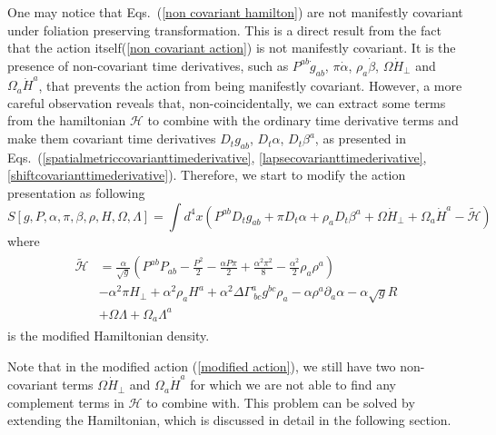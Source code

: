 One may notice that Eqs.~(\ref{non covariant hamilton}) are not manifestly covariant under foliation preserving transformation. This is a direct result from the fact that the action itself(\ref{non covariant action}) is not manifestly covariant. It is the presence of non-covariant time derivatives, such as $P^{ab}{\dot g}_{ab}$, $\pi{\dot \alpha}$, $\rho_{a}{\dot \beta}$, $\Omega{\dot H}_{\perp}$ and $\Omega_{a}{\dot H}^{a}$, that prevents the action from being manifestly covariant. However, a more careful observation reveals that, non-coincidentally, we can extract some terms from the hamiltonian $\mathscr{H}$ to combine with the ordinary time derivative terms and make them covariant time derivatives $D_{t}g_{ab}$, $D_{t}\alpha$, $D_{t}\beta^{a}$, as presented in Eqs.~(\ref{spatialmetriccovarianttimederivative}, \ref{lapsecovarianttimederivative}, \ref{shiftcovarianttimederivative}). Therefore, we start to modify the action presentation as following
\begin{equation}\label{modified action}
S[g, P, \alpha, \pi, \beta, \rho, H, \Omega, \Lambda ] = \int d^{4}x \left( P^{ab}D_{t}g_{ab} + \pi D_{t}\alpha + \rho_{a}D_{t}\beta^{a} + \Omega {\dot H}_{\perp} + \Omega_{a}{\dot H}^{a} - \tilde{\mathscr{H}}\right)
\end{equation}
where
\begin{align}
\begin{split}
\tilde{\mathscr{H}} & = \frac{\alpha}{\sqrt{g}}\left(P^{ab}P_{ab} - \frac{P^{2}}{2} - \frac{\alpha P \pi}{2} + \frac{\alpha^{2}\pi^{2}}{8} - \frac{\alpha^{2}}{2}\rho_{a}\rho^{a}\right)\\
& -\alpha^{2}\pi H_{\perp} + \alpha^{2}\rho_{a}H^{a} + \alpha^{2}\Delta\Gamma^{a}_{~bc}g^{bc}\rho_{a} - \alpha \rho^{a}\partial_{a}\alpha - \alpha\sqrt{g}R\\
& + \Omega \Lambda + \Omega_{a}\Lambda^{a}
\end{split}
\end{align}
is the modified Hamiltonian density. 

Note that in the modified action (\ref{modified action}), we still have two non-covariant terms $\Omega {\dot H}_{\perp}$ and $\Omega_{a}{\dot H}^{a}$ for which we are not able to find any complement terms in $\mathscr{H}$ to combine with. This problem can be solved by extending the Hamiltonian, which is discussed in detail in the following section. 
